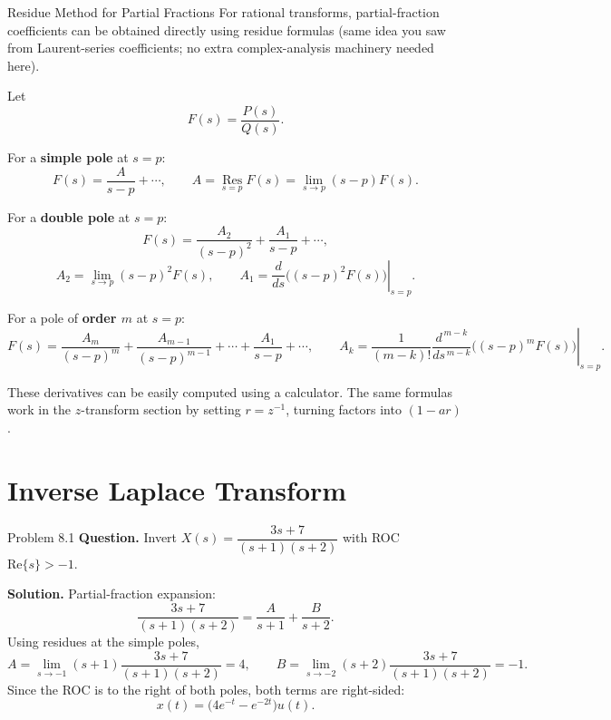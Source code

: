 \documentclass[10pt]{article}
\newcommand{\Prompt}[1]{\textbf{Question.} #1}
\newcommand{\SketchLabel}{\tcblower\textbf{Solution.}}
\begin{document}
\begin{conceptbox}{Residue Method for Partial Fractions}
  For rational transforms, partial-fraction coefficients can be obtained directly using residue formulas (same idea you saw from Laurent-series coefficients; no extra complex-analysis machinery needed here).

  Let
  \[
    F(s)=\frac{P(s)}{Q(s)}.
  \]

  For a \textbf{simple pole} at \(s=p\):
  \[
    F(s)=\frac{A}{s-p}+\cdots,
    \qquad
    A=\operatorname*{Res}_{s=p}F(s)=\lim_{s\to p}(s-p)F(s).
  \]

  For a \textbf{double pole} at \(s=p\):
  \[
    F(s)=\frac{A_2}{(s-p)^2}+\frac{A_1}{s-p}+\cdots,
  \]
  \[
    A_2=\lim_{s\to p}(s-p)^2F(s),
    \qquad
    A_1=\left.\frac{d}{ds}\Big((s-p)^2F(s)\Big)\right|_{s=p}.
  \]

  For a pole of \textbf{order \(m\)} at \(s=p\):
  \[
    F(s)=\frac{A_m}{(s-p)^m}+\frac{A_{m-1}}{(s-p)^{m-1}}+\cdots+\frac{A_1}{s-p}+\cdots,
    \qquad
    A_k=\frac{1}{(m-k)!}\left.\frac{d^{\,m-k}}{ds^{\,m-k}}\Big((s-p)^mF(s)\Big)\right|_{s=p}.
  \]

  These derivatives can be easily computed using a calculator. The same formulas work in the \(z\)-transform section by setting \(r=z^{-1}\), turning factors into \((1-ar)\).
\end{conceptbox}

\newpage

\section{Inverse Laplace Transform}

\begin{examplebox}{Problem 8.1}
  \Prompt{Invert \(X(s)=\dfrac{3s+7}{(s+1)(s+2)}\) with ROC \(\text{Re}\{s\}>-1\).}

  \medskip
  \SketchLabel{}
  Partial-fraction expansion:
  \[
    \frac{3s+7}{(s+1)(s+2)}=\frac{A}{s+1}+\frac{B}{s+2}.
  \]
  Using residues at the simple poles,
  \[
    A=\lim_{s\to-1}(s+1)\frac{3s+7}{(s+1)(s+2)}=4,
    \qquad
    B=\lim_{s\to-2}(s+2)\frac{3s+7}{(s+1)(s+2)}=-1.
  \]
  Since the ROC is to the right of both poles, both terms are right-sided:
  \[
    x(t)=\bigl(4e^{-t}-e^{-2t}\bigr)u(t).
  \]

  \begin{center}
  \end{center}
\end{examplebox}
\end{document}

